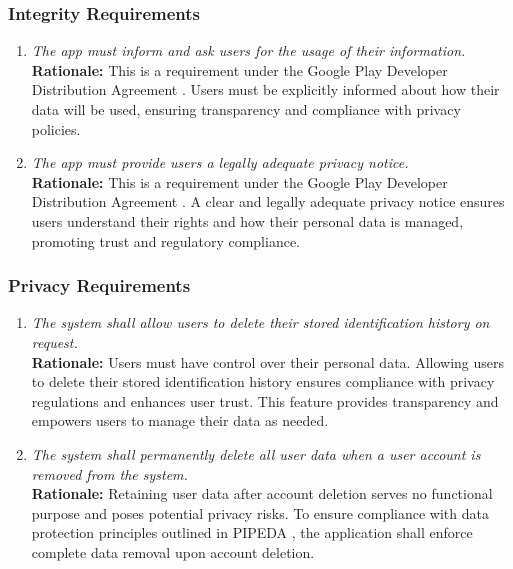 \documentclass[]{article}
\begin{document}
\subsubsection{Integrity Requirements}
\label{ssub:integrity_requirements}
\begin{enumerate}[{SR-INT}1. ]
    \item \textit{The app must inform and ask users for the usage of their information.}
    \\ \textbf{Rationale:} This is a requirement under the Google Play Developer Distribution Agreement \cite{GooglePlayAgreement}. Users must be explicitly informed about how their data will be used, ensuring transparency and compliance with privacy policies.

    \item \textit{The app must provide users a legally adequate privacy notice.}
    \\ \textbf{Rationale:} This is a requirement under the Google Play Developer Distribution Agreement \cite{GooglePlayAgreement}. A clear and legally adequate privacy notice ensures users understand their rights and how their personal data is managed, promoting trust and regulatory compliance.
\end{enumerate}

\subsubsection{Privacy Requirements}
\label{ssub:privacy_requirements}
\begin{enumerate}[{SR-P}1. ]
	\item \textit{The system shall allow users to delete their stored identification history on request.}
	\\ \textbf{Rationale:} Users must have control over their personal data. Allowing users to delete their stored identification history ensures compliance with privacy regulations and enhances user trust. This feature provides transparency and empowers users to manage their data as needed.
	\item \textit{The system shall permanently delete all user data when a user account is removed from the system.}
	\\ \textbf{Rationale:} Retaining user data after account deletion serves no functional purpose and poses potential privacy risks. To ensure compliance with data protection principles outlined in PIPEDA \cite{PIPEDA1}, the application shall enforce complete data removal upon account deletion.
\end{enumerate}
\end{document}
